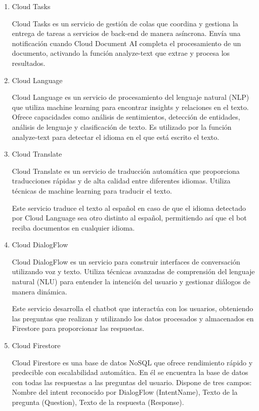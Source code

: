 \begin{enumerate}
    \item Cloud Tasks
    
    Cloud Tasks es un servicio de gestión de colas que coordina y gestiona la entrega de tareas a servicios de back-end de manera asíncrona. Envía una notificación cuando Cloud Document AI completa el procesamiento de un documento, activando la función analyze-text que extrae y procesa los resultados.
    
    \item Cloud Language
    
    Cloud Language es un servicio de procesamiento del lenguaje natural (NLP) que utiliza machine learning para encontrar insights y relaciones en el texto. Ofrece capacidades como análisis de sentimientos, detección de entidades, análisis de lenguaje y clasificación de texto. Es utilizado por la función analyze-text para detectar el idioma en el que está escrito el texto.
    
    \item Cloud Translate
    
    Cloud Translate es un servicio de traducción automática que proporciona traducciones rápidas y de alta calidad entre diferentes idiomas. Utiliza técnicas de machine learning para traducir el texto.
    
    Este servicio traduce el texto al español en caso de que el idioma detectado por Cloud Language sea otro distinto al español, permitiendo así que el bot reciba documentos en cualquier idioma.
    
    \item Cloud DialogFlow
    
    Cloud DialogFlow es un servicio para construir interfaces de conversación utilizando voz y texto. Utiliza técnicas avanzadas de comprensión del lenguaje natural (NLU) para entender la intención del usuario y gestionar diálogos de manera dinámica.
    
    Este servicio desarrolla el chatbot que interactúa con los usuarios, obteniendo las preguntas que realizan y utilizando los datos procesados y almacenados en Firestore para proporcionar las respuestas.
    
    \item Cloud Firestore
    
    Cloud Firestore es una base de datos NoSQL que ofrece rendimiento rápido y predecible con escalabilidad automática. En él se encuentra la base de datos con todas las respuestas a las preguntas del usuario. Dispone de tres campos: Nombre del intent reconocido por DialogFlow (IntentName), Texto de la pregunta (Question), Texto de la respuesta (Response).
    
\end{enumerate}

